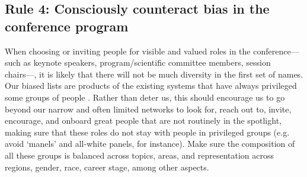 \documentclass[10pt,letterpaper]{article}
\begin{document}
\subsection*{Rule 4: Consciously counteract bias in the conference program}
\label{rule_unbias}

When choosing or inviting people for visible and valued roles in the conference––such as keynote speakers, program/scientific committee members, session chairs––, it is likely that there will not be much diversity in the first set of names.
Our biased lists are products of the existing systems that have always privileged some groups of people \cite{dwyerNoticeWhoScience2021,swartzScienceValueDiversity2019,wongBuildDiversityScience2020,dignazioUnicornsJanitorsNinjas2020}. 
Rather than deter us, this should encourage us to go beyond our narrow and often limited networks to look for, reach out to, invite, encourage, and onboard great people that are not routinely in the spotlight, making sure that these roles do not stay with people in privileged groups (e.g. avoid `manels' and all-white panels, for instance).
Make sure the composition of all these groups is balanced across topics, areas, and representation across regions, gender, race, career stage, among other aspects.



\end{document}
